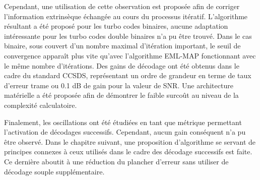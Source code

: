 Cependant, une utilisation de cette observation est proposée afin de corriger l'information extrinsèque échangée au 
cours du processus itératif. L'algorithme résultant a été proposé pour les turbo codes binaires, aucune adaptation intéressante 
pour les turbo codes double binaires n'a pu être trouvé. Dans le cas binaire, sous couvert d'un nombre maximal d'itération
important, le seuil de convergence apparaît plus vite qu'avec l'algorithme EML-MAP fonctionnant avec le même nombre 
d'itérations. Des gains de décodage ont été obtenus dans le cadre du standard CCSDS, représentant un ordre de grandeur en terme de taux d'erreur trame 
ou 0.1 dB de gain pour la valeur de SNR. Une architecture matérielle a été proposée afin de démontrer le faible surcoût au niveau de la complexité
calculatoire.

Finalement, les oscillations ont été étudiées en tant que métrique permettant l'activation de décodages successifs. 
Cependant, aucun gain conséquent n'a pu être observé. Dans le chapitre suivant, une proposition d'algorithme se servant de 
 principes connexes à ceux utilisés dans le cadre des décodage successifs est faite. Ce dernière aboutit à une réduction
du plancher d'erreur sans utiliser de décodage souple supplémentaire.